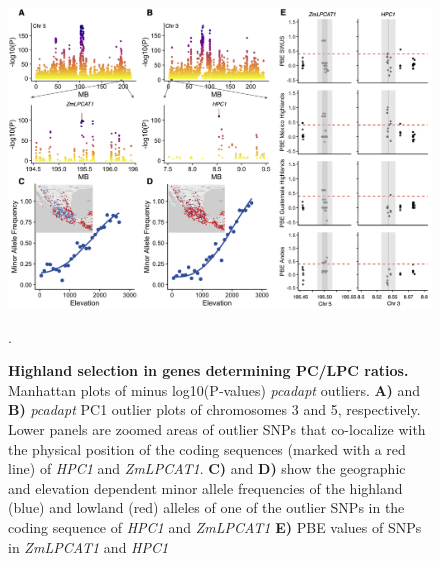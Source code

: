 \documentclass[9pt,twocolumn,twoside,lineno]{BioRxiv}
\begin{document}
\begin{figure}[ht]
\begin{center}
\includegraphics[width=0.6\paperwidth]{Figures/Fig_2.png}
\caption{\textbf{Highland selection in genes determining PC/LPC ratios.}
Manhattan plots of minus log10(P‐values) \textit{pcadapt} outliers. 
\textbf{A)} and \textbf{B)} \textit{pcadapt} PC1 outlier plots of chromosomes 3 and 5, respectively. 
Lower panels are zoomed areas of outlier SNPs that co-localize with the physical position of the coding sequences (marked with a red line) of \textit{HPC1} and \textit{ZmLPCAT1}. 
\textbf{C)} and \textbf{D)} show the geographic and elevation dependent minor allele frequencies of the highland (blue) and lowland (red) alleles of one of the outlier SNPs in the coding sequence of \textit{HPC1} and \textit{ZmLPCAT1}
\textbf{E)} PBE values of SNPs in \textit{ZmLPCAT1} and \textit{HPC1}}. 
\label{Fig2}
\end{center}
\end{figure}
\end{document}
